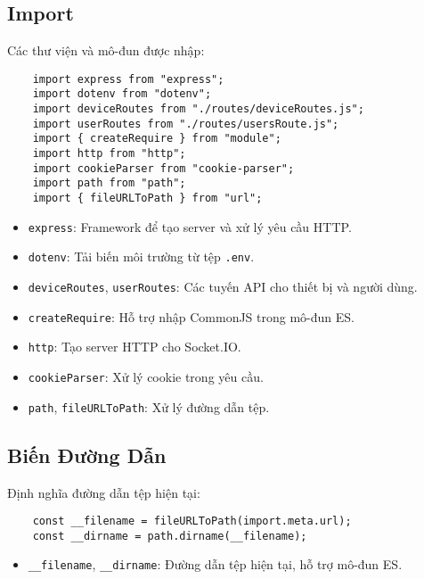         \subsection{Import}
            \hspace*{0.6cm}Các thư viện và mô-đun được nhập:
            \begin{lstlisting}
    import express from "express";
    import dotenv from "dotenv";
    import deviceRoutes from "./routes/deviceRoutes.js";
    import userRoutes from "./routes/usersRoute.js";
    import { createRequire } from "module";
    import http from "http";
    import cookieParser from "cookie-parser";
    import path from "path";
    import { fileURLToPath } from "url";
            \end{lstlisting}
            \begin{itemize}
                \item \texttt{express}: Framework để tạo server và xử lý yêu cầu HTTP.
                \item \texttt{dotenv}: Tải biến môi trường từ tệp \texttt{.env}.
                \item \texttt{deviceRoutes}, \texttt{userRoutes}: Các tuyến API cho thiết bị và người dùng.
                \item \texttt{createRequire}: Hỗ trợ nhập CommonJS trong mô-đun ES.
                \item \texttt{http}: Tạo server HTTP cho Socket.IO.
                \item \texttt{cookieParser}: Xử lý cookie trong yêu cầu.
                \item \texttt{path}, \texttt{fileURLToPath}: Xử lý đường dẫn tệp.
            \end{itemize}

        \subsection{Biến Đường Dẫn}
            \hspace*{0.6cm}Định nghĩa đường dẫn tệp hiện tại:
            \begin{lstlisting}
    const __filename = fileURLToPath(import.meta.url);
    const __dirname = path.dirname(__filename);
            \end{lstlisting}
            \begin{itemize}
                \item \texttt{\_\_filename}, \texttt{\_\_dirname}: Đường dẫn tệp hiện tại, hỗ trợ mô-đun ES.
            \end{itemize}

